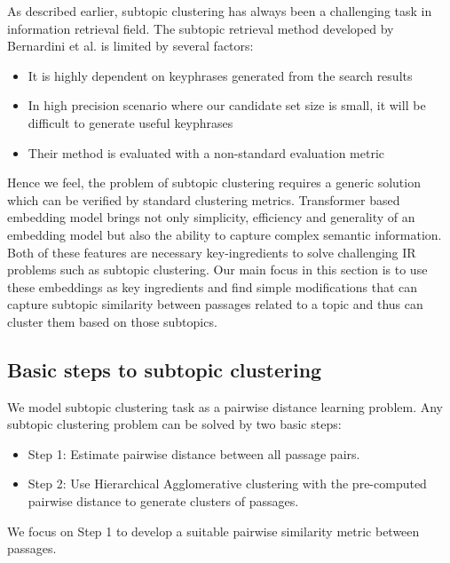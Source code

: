 As described earlier, subtopic clustering has always been a challenging task in information retrieval field. The subtopic retrieval method developed by Bernardini et al. is limited by several factors: 
\begin{itemize}
    \item It is highly dependent on keyphrases generated from the search results
    \item In high precision scenario where our candidate set size is small, it will be difficult to generate useful keyphrases
    \item Their method is evaluated with a non-standard evaluation metric
\end{itemize}
Hence we feel, the problem of subtopic clustering requires a generic solution which can be verified by standard clustering metrics. Transformer based embedding model brings not only simplicity, efficiency and generality of an embedding model but also the ability to capture complex semantic information. Both of these features are necessary key-ingredients to solve challenging IR problems such as subtopic clustering. Our main focus in this section is to use these embeddings as key ingredients and find simple modifications that can capture subtopic similarity between passages related to a topic and thus can cluster them based on those subtopics.

\subsection{Basic steps to subtopic clustering} We model subtopic clustering task as a pairwise distance learning problem. Any subtopic clustering problem can be solved by two basic steps:
\begin{itemize}
    \item Step 1: Estimate pairwise distance between all passage pairs.
    \item Step 2: Use Hierarchical Agglomerative clustering with the pre-computed pairwise distance to generate clusters of passages.
\end{itemize}

We focus on Step 1 to develop a suitable pairwise similarity metric between passages.

